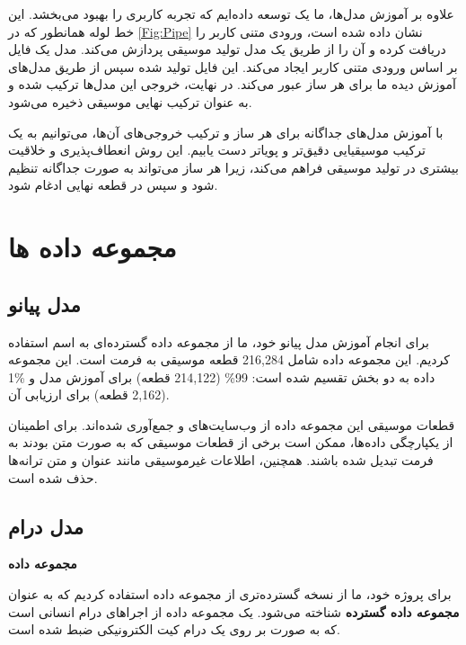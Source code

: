 علاوه بر آموزش مدل‌ها، ما یک   توسعه داده‌ایم که تجربه کاربری را بهبود می‌بخشد. این خط لوله همانطور که در \ref{Fig:Pipe} نشان داده شده است، ورودی متنی کاربر را دریافت کرده و آن را از طریق یک مدل تولید موسیقی  \cite{copet2023simple} پردازش می‌کند. مدل  یک فایل  بر اساس ورودی متنی کاربر ایجاد می‌کند. این فایل  تولید شده سپس از طریق مدل‌های آموزش دیده ما برای هر ساز عبور می‌کند. در نهایت، خروجی این مدل‌ها ترکیب شده و به عنوان ترکیب نهایی موسیقی ذخیره می‌شود.

با آموزش مدل‌های جداگانه برای هر ساز و ترکیب خروجی‌های آن‌ها، می‌توانیم به یک ترکیب موسیقیایی دقیق‌تر و پویا‌تر دست یابیم. این روش انعطاف‌پذیری و خلاقیت بیشتری در تولید موسیقی فراهم می‌کند، زیرا هر ساز می‌تواند به صورت جداگانه تنظیم شود و سپس در قطعه نهایی ادغام شود.

\section{مجموعه داده ها}
\subsection{مدل پیانو}

برای انجام آموزش مدل پیانو خود، ما از مجموعه داده گسترده‌ای به اسم   \cite{DBLP:conf/hcmir/WuLY023} استفاده کردیم. این مجموعه داده شامل 216,284 قطعه موسیقی به فرمت  است. این مجموعه داده به دو بخش تقسیم شده است: 99\% (214,122 قطعه) برای آموزش مدل و \%1 (2,162 قطعه) برای ارزیابی آن.

قطعات موسیقی این مجموعه داده از وب‌سایت‌های  و  جمع‌آوری شده‌اند. برای اطمینان از یکپارچگی داده‌ها، ممکن است برخی از قطعات موسیقی که به صورت متن بودند به فرمت  تبدیل شده باشند. همچنین، اطلاعات غیرموسیقی مانند عنوان و متن ترانه‌ها حذف شده است.
\subsection{مدل درام}
\textbf{مجموعه داده  \cite{callender2020improving}}

برای پروژه خود، ما از نسخه گسترده‌تری از مجموعه داده 
استفاده کردیم که به عنوان \textbf{مجموعه داده گسترده }
شناخته می‌شود.  یک مجموعه داده از اجراهای درام انسانی است که به صورت
 بر روی یک درام کیت الکترونیکی  ضبط شده است.


